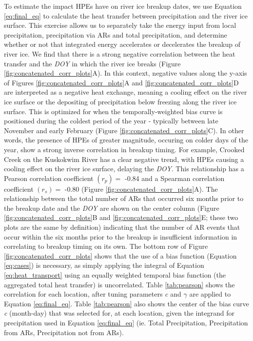 \documentclass[12pts,draft]{AR_analysis_}
\begin{document}
To estimate the impact HPEs have on river ice breakup dates, we use 
Equation \ref{eq:final_eq} to calculate the heat transfer
between precipitation and the river ice surface. This 
exercise allows us to separately take the energy input from 
local precipitation, 
precipitation via ARs and total precipitation, 
and determine whether or not that integrated 
energy accelerates or decelerates the breakup of river ice. 
We find that there is a strong negative correlation between the heat 
transfer and the \emph{DOY} 
in which the river ice breaks (Figure
\ref{fig:concatenated_corr_plots}A). In this context, negative values 
along the y-axis of Figures \ref{fig:concatenated_corr_plots}A and 
\ref{fig:concatenated_corr_plots}D 
are interpreted
as a negative heat exchange, meaning a cooling effect on the river ice
surface or the depositing of precipitation below freezing along the 
river ice surface. This is optimized for 
when the temporally-weighted bias curve
is positioned during the coldest period of the year - typically between
late November and early February (Figure \ref{fig:concatenated_corr_plots}C).
In other words, the presence of HPEs of greater magnitude, occuring 
on colder days of the 
year, show a strong inverse correlation in breakup timing. 
For example, Crooked Creek on the Kuskokwim River has a
clear negative trend, with HPEs causing a cooling effect on the
river ice surface, delaying the \emph{DOY}. This relationship has a Pearson 
correlation
coefficient $ (r_{p} )=$ -0.84 and a Spearman correlation coefficient
$(r_{s}) =$ -0.80 (Figure \ref{fig:concatenated_corr_plots}A). 
The relationship between the total
number of ARs that occurred six months prior to the breakup date and the
\emph{DOY} are shown on the center column 
(Figure \ref{fig:concatenated_corr_plots}B and 
\ref{fig:concatenated_corr_plots}E; 
these two plots are the same by
definition) indicating that the number of AR 
events that occur within the six months prior to the breakup
is insufficient information 
in correlating to breakup timing on its own. The
bottom row of Figure \ref{fig:concatenated_corr_plots} shows that the
use of a bias function (Equation \ref{eq:cases}) is necessary, as simply 
applying the integral of Equation \ref{eq:heat_transport} using an 
equally weighted temporal bias function (the aggregated total heat 
transfer) is uncorrelated. 
Table \ref{tab:pearson} shows the correlation for each location, after
tuning parameters \emph{c} and $\gamma$ are applied to Equation 
\ref{eq:final_eq}.
Table \ref{tab:pearson} also shows the center of the bias curve \emph{c} 
(month-day)
that was selected for, at each location, given the integrand for 
precipitation used in
Equation \ref{eq:final_eq} (ie. Total Precipitation, Precipitation from ARs, 
Precipitation not from ARs).  
\end{document}
